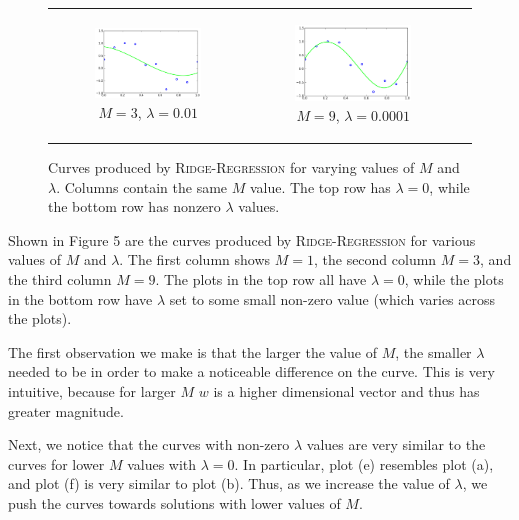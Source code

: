 \documentclass{sigchi}
\begin{document}
\begin{figure}[!t]
\begin{tabular}{c c c}
\begin{subfigure}[b]{2.25in}
	\includegraphics[width = 2.25in]{3-3-01.png}
	\caption{$M = 3$, $\lambda = 0.01$}
\end{subfigure} &

\begin{subfigure}[b]{2.25in}
	\includegraphics[width = 2.25in]{3-9-0001.png}
	\caption{$M = 9$, $\lambda = 0.0001$}
\end{subfigure} \\
\end{tabular}
\caption{Curves produced by \textsc{Ridge-Regression} for varying values of $M$ and $\lambda$. Columns contain the same $M$ value. The top row has $\lambda = 0$, while the bottom row has nonzero $\lambda$ values.}
\end{figure}

Shown in Figure 5 are the curves produced by \textsc{Ridge-Regression} for various values of $M$ and $\lambda$. The first column shows $M = 1$, the second column $M = 3$, and the third column $M = 9$. The plots in the top row all have $\lambda = 0$, while the plots in the bottom row have $\lambda$ set to some small non-zero value (which varies across the plots).

The first observation we make is that the larger the value of $M$, the smaller $\lambda$ needed to be in order to make a noticeable difference on the curve. This is very intuitive, because for larger $M$ $w$ is a higher dimensional vector and thus has greater magnitude.

Next, we notice that the curves with non-zero $\lambda$ values are very similar to the curves for lower $M$ values with $\lambda = 0$. In particular, plot (e) resembles plot (a), and plot (f) is very similar to plot (b). Thus, as we increase the value of $\lambda$, we push the curves towards solutions with lower values of $M$.
\end{document}
